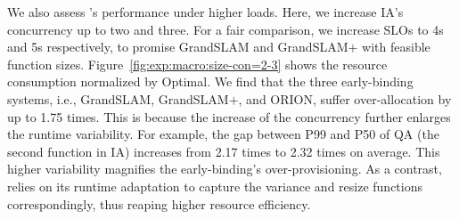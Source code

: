 We also assess \namex's performance under higher loads.
Here, we increase IA's concurrency up to two and three.
For a fair comparison, we increase SLOs to 4s and 5s respectively, to promise GrandSLAM and GrandSLAM$+$ with feasible function sizes.
Figure~\ref{fig:exp:macro:size-con=2-3} shows the resource consumption normalized by Optimal. 
We find that the three early-binding systems, i.e., GrandSLAM, GrandSLAM$+$, and ORION, suffer over-allocation by up to 1.75 times.
This is because the increase of the concurrency further enlarges the runtime variability.
For example, the gap between P99 and P50 of QA (the second function in IA) increases from 2.17 times to 2.32 times on average.
This higher variability magnifies the early-binding's over-provisioning.
As a contrast, \namex relies on its runtime adaptation to capture the variance and resize functions correspondingly, thus reaping higher resource efficiency.




